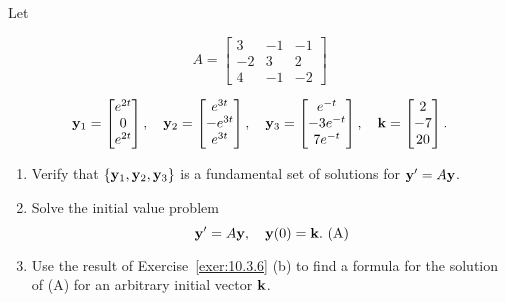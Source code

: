 \documentclass{ximera}
\begin{document}
\begin{problem}\label{exer:10.3.11}
Let

$$ A=\begin{bmatrix} 3 &-1 & -1\\ -2 & 3 &
2\\4 & -1 & -2\end{bmatrix}$$

$${\bf y}_1=\begin{bmatrix} e^{2t} \\ 0 \\ e^{2t}\end{bmatrix}, \quad
{\bf y}_2=\begin{bmatrix} e^{3t} \\-e^{3t} \\
e^{3t}\end{bmatrix}, \quad
{\bf y}_3=\begin{bmatrix} e^{-t} \\-3e^{-t} \\
7e^{-t}
\end{bmatrix}, \quad {\bf k}=\begin{bmatrix}
2 \\-7 \\ 20\end{bmatrix}.$$


\begin{enumerate}
\item %
 Verify that $\{{\bf y}_1,{\bf y}_2,{\bf y}_3\}$
is a fundamental set of solutions for
${\bf y}'=A{\bf y}$.

\item %
 Solve the initial value problem
$$
{\bf y}'=A{\bf y}, \quad   {\bf y}(0)={\bf k}.
\text{ (A)}
$$

\item %
Use the result of Exercise~\ref{exer:10.3.6} (b) to find a formula
for
 the solution of  (A)
for an arbitrary initial vector ${\bf k}$.
\end{enumerate}
\end{problem}
\end{document}
